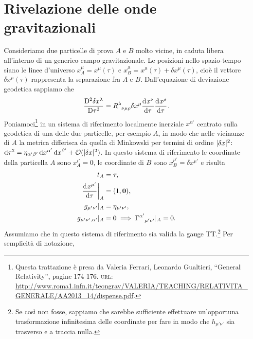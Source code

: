 \section{Rivelazione delle onde gravitazionali}
\label{sec:rivelazione-onde}

Consideriamo due particelle di prova $A$ e $B$ molto vicine, in caduta libera
all'interno di un generico campo gravitazionale.  Le posizioni nello
spazio-tempo siano le linee d'universo $x^{\mu}_{A} = x^{\mu}(\tau)$ e
$x^{\mu}_{B} = x^{\mu}(\tau) + \delta x^{\mu}(\tau)$, cioè il vettore $\delta
x^{\mu}(\tau)$ rappresenta la separazione fra $A$ e $B$.  Dall'equazione di
deviazione geodetica sappiamo che
\begin{equation}
  \label{eq:onde-grav-dev-geo}
  \curder[2]{\delta x^{\lambda}} = \tensor{R}{^{\lambda}_{\nu\mu\rho}} \delta
  x^{\mu} \toder{x^{\nu}}{\tau} \toder{x^{\rho}}{\tau}.
\end{equation}
Poniamoci\footnote{Questa trattazione è presa da Valeria Ferrari, Leonardo
  Gualtieri, ``General Relativity'', pagine 174-176.  \textsc{url}:
  \url{http://www.roma1.infn.it/teongrav/VALERIA/TEACHING/RELATIVITA_GENERALE/AA2013_14/dispense.pdf}.}
in un sistema di riferimento localmente inerziale $x^{\alpha'}$ centrato sulla
geodetica di una delle due particelle, per esempio $A$, in modo che nelle
vicinanze di $A$ la metrica differisca da quella di Minkowski per termini di
ordine $\lvert\delta x\rvert^{2}$: $\mathop{}\!\mathrm{d} \tau^{2} = \eta_{\alpha'\beta'}\mathop{}\!\mathrm{d}
x^{\alpha'}\mathop{}\!\mathrm{d} x^{\beta'} + \mathcal{O}(\lvert\delta x\rvert^{2})$.  In questo sistema
di riferimento le coordinate della particella $A$ sono $x_{A}^{i'} = 0$, le
coordinate di $B$ sono $x^{\mu'}_{B} = \delta x^{\mu'}$ e risulta
\begin{subequations}
  \begin{align}
    t_{A} &= \tau, \\
    \label{eq:foo-geodetica-A}
    \toder{x^{\mu'}}{\tau}\bigg|_{A} &= (1, \bm{0}), \\
    g_{\mu'\nu'}|_{A} &= \eta_{\mu'\nu'}, \\
    g_{\mu'\nu',\alpha'}|_{A} &= 0 \implies
    \tensor{\Gamma}{^{\alpha'}_{\mu'\nu'}}|_{A} = 0.
  \end{align}
\end{subequations}
Assumiamo che in questo sistema di riferimento sia valida la gauge
TT.\footnote{Se così non fosse, sappiamo che sarebbe sufficiente effettuare
  un'opportuna trasformazione infinitesima delle coordinate per fare in modo che
  $h_{\mu'\nu'}$ sia trasverso e a traccia nulla.}  Per semplicità di notazione,
